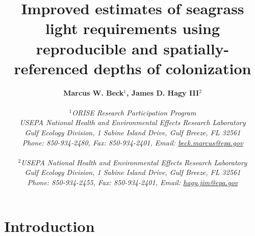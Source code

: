 \documentclass[letterpaper,12pt,oneside]{article}\usepackage[]{graphicx}\usepackage[]{color}
\begin{document}
\raggedbottom
\linenumbers
\raggedright
{}
\setlength{\parindent}{0.5in}
\renewcommand\refname{References \vspace{12pt}}

\begin{singlespace}
\title{{\bf {\Large Improved estimates of seagrass light requirements using reproducible and spatially-referenced depths of colonization}}}
\author{
  {\bf {\normalsize Marcus W. Beck$^1$, James D. Hagy III$^2$}}
  \\\\{\textit {\normalsize $^1$ORISE Research Participation Program}}
  \\{\textit {\normalsize USEPA National Health and Environmental Effects Research Laboratory}}
  \\{\textit {\normalsize Gulf Ecology Division, 1 Sabine Island Drive, Gulf Breeze, FL 32561}}
	\\{\textit {\normalsize Phone: 850-934-2480, Fax: 850-934-2401, Email: \href{mailto:beck.marcus@epa.gov}{beck.marcus@epa.gov}}}
  \\\\{\textit {\normalsize $^2$USEPA National Health and Environmental Effects Research Laboratory}}
	\\{\textit {\normalsize Gulf Ecology Division, 1 Sabine Island Drive, Gulf Breeze, FL 32561}}
	\\{\textit {\normalsize Phone: 850-934-2455, Fax: 850-934-2401, Email: \href{mailto:hagy.jim@epa.gov}{hagy.jim@epa.gov}}}
	}
\date{}
\maketitle
\end{singlespace}
\clearpage

\section{Introduction}
\end{document}
